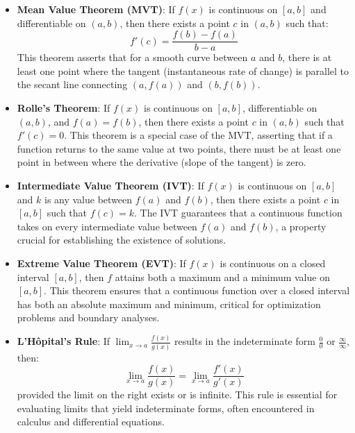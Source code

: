 \begin{itemize}

\item \textbf{Mean Value Theorem (MVT)}:  
If \( f(x) \) is continuous on \( [a,b] \) and differentiable on \( (a,b) \), then there exists a point \( c \) in \( (a,b) \) such that:
\[f'(c) = \frac{f(b) - f(a)}{b - a}\]
This theorem asserts that for a smooth curve between \( a \) and \( b \), there is at least one point where the tangent (instantaneous rate of change) is parallel to the secant line connecting \( (a, f(a)) \) and \( (b, f(b)) \).

\item \textbf{Rolle's Theorem}:  
If \( f(x) \) is continuous on \( [a,b] \), differentiable on \( (a,b) \), and \( f(a) = f(b) \), then there exists a point \( c \) in \( (a,b) \) such that \( f'(c) = 0 \).
This theorem is a special case of the MVT, asserting that if a function returns to the same value at two points, there must be at least one point in between where the derivative (slope of the tangent) is zero.

\item \textbf{Intermediate Value Theorem (IVT)}:  
If \( f(x) \) is continuous on \( [a,b] \) and \( k \) is any value between \( f(a) \) and \( f(b) \), then there exists a point \( c \) in \( [a,b] \) such that \( f(c) = k \).
The IVT guarantees that a continuous function takes on every intermediate value between \( f(a) \) and \( f(b) \), a property crucial for establishing the existence of solutions.

\item \textbf{Extreme Value Theorem (EVT)}:  
If \( f(x) \) is continuous on a closed interval \( [a,b] \), then \( f \) attains both a maximum and a minimum value on \( [a,b] \).
This theorem ensures that a continuous function over a closed interval has both an absolute maximum and minimum, critical for optimization problems and boundary analyses.

\item \textbf{L'Hôpital's Rule}:  
If \( \lim_{x \to a} \frac{f(x)}{g(x)} \) results in the indeterminate form \( \frac{0}{0} \) or \( \frac{\infty}{\infty} \), then:
\[\lim_{x \to a} \frac{f(x)}{g(x)} = \lim_{x \to a} \frac{f'(x)}{g'(x)}\]
provided the limit on the right exists or is infinite. This rule is essential for evaluating limits that yield indeterminate forms, often encountered in calculus and differential equations.


\end{itemize}
